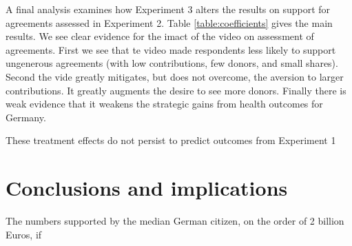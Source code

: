 \documentclass[12pt,oneside,smallheadings,chapterprefix=true]{article}
\begin{document}
A final analysis examines how Experiment 3 alters the results on support for agreements assessed in Experiment 2. Table \ref{table:coefficients} gives the main results. We see clear evidence for the imact of the video on assessment of agreements. First we see that te video made respondents less likely to support ungenerous agreements (with low contributions, few donors, and small shares). Second the vide greatly mitigates, but does not overcome, the aversion to larger contributions. It greatly augments the desire to see more donors. Finally there is weak evidence that it weakens the strategic gains from health outcomes for Germany. 

These treatment effects do not persist to predict outcomes from Experiment 1



\section{Conclusions and implications}


The numbers supported by the median German citizen, on the order of 2 billion Euros, if 




\end{document}

